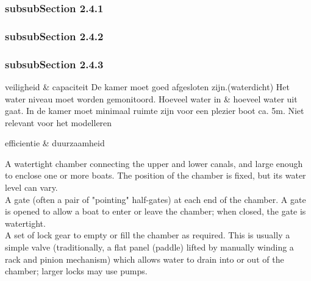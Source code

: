 \documentclass{article}
\begin{document}
\subsubsection{subsubSection 2.4.1}
\subsubsection{subsubSection 2.4.2}
\subsubsection{subsubSection 2.4.3}

veiligheid & capaciteit
De kamer moet goed afgesloten zijn.(waterdicht)
	Het water niveau moet worden gemonitoord.
		Hoeveel water in & hoeveel water uit gaat.
In de kamer moet minimaal ruimte zijn voor een plezier boot ca. 5m.
	Niet relevant voor het modelleren


efficientie & duurzaamheid

A watertight chamber connecting the upper and lower canals, and large enough to enclose one or more boats. The position of the chamber is fixed, but its water level can vary.\\
A gate (often a pair of "pointing" half-gates) at each end of the chamber. A gate is opened to allow a boat to enter or leave the chamber; when closed, the gate is watertight.\\
A set of lock gear to empty or fill the chamber as required. This is usually a simple valve (traditionally, a flat panel (paddle) lifted by manually winding a rack and pinion mechanism) which allows water to drain into or out of the chamber; larger locks may use pumps.





\newpage

\newpage


\end{document}
